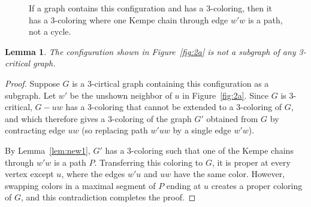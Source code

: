 \documentclass[12pt]{article}
\theoremstyle{plain}
\newtheorem{lem}[prop]{Lemma}
\theoremstyle{definition}
\theoremstyle{remark}
\begin{document}
\begin{figure}
\caption{If a graph contains this configuration and has a 3-coloring, then it
has a 3-coloring where one Kempe chain through edge $w'w$ is a path, not a cycle.
\label{fig:KempePath}
}
\end{figure}

\begin{lem}
The configuration shown in Figure~\ref{fig:2a} is not a
subgraph of any 3-critical graph.
\label{lem:new2}
\label{lem:fig2a}
\end{lem}
\begin{proof}
Suppose $G$ is a 3-cirtical graph containing this configuration as a subgraph.
Let $w'$ be the unshown neighbor of $u$ in Figure~\ref{fig:2a}.
Since $G$ is 3-critical, $G-uw$ has a 3-coloring
that cannot be extended to a 3-coloring of $G$, and which therefore gives a
3-coloring of the graph $G'$ obtained from $G$ by contracting edge $uw$ (so
replacing path $w'uw$ by a single edge $w'w$).

By Lemma~\ref{lem:new1}, $G'$ has a 3-coloring such that one of the Kempe chains
through $w'w$ is a path $P$.  Transferring this coloring to $G$, it is 
proper at every vertex except $u$, where the edges $w'u$ and $uw$ have the same
color.  However, swapping colors in a maximal segment of $P$ ending at $u$
creates a proper coloring of $G$, and this contradiction completes the proof.
\end{proof}
\end{document}
